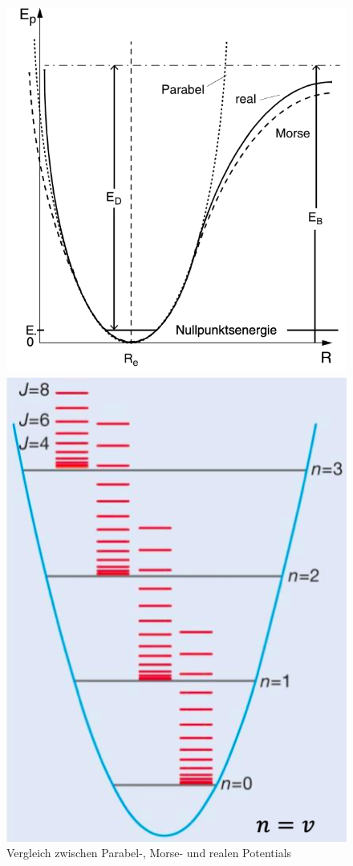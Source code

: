 \begin{figure}[H]
    \centering
   \begin{minipage}[b]{.4\linewidth}
      \includegraphics[width=\linewidth]{resources/16-03-2012/Vergleich_ParabelMorseReal.png}
      \caption{Vergleich zwischen Parabel-, Morse- und realen Potentials}
   \end{minipage}
   \hspace{.1\linewidth}
   \begin{minipage}[b]{.4\linewidth} 
      \includegraphics[width=0.8\linewidth]{resources/16-03-2012/SchwingugsRotatioinsspektrum.png}

\end{minipage}
\end{figure}
